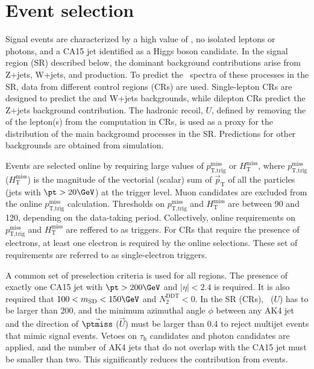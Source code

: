 \section{Event selection}


Signal events are characterized by a high value of \MET, no isolated leptons or photons, and a CA15 jet identified as a Higgs boson candidate. In the signal region (SR) described
below, the dominant background contributions arise from Z+jets,
W+jets, and \ttbar production. To predict the \ptmiss~spectra of these
processes in the SR, data from different control regions (CRs) are used. Single-lepton CRs are designed to predict the \ttbar and W+jets backgrounds, while dilepton CRs predict the Z+jets background contribution. The hadronic recoil, $U$, defined by removing the \pt of the lepton(s) from the \MET computation in CRs, is used as a proxy for the \MET distribution of the main background processes in the SR. Predictions for other backgrounds are obtained from simulation.

Events are selected online by requiring large values of $p_\text{T,trig}^\text{miss}$ or $H_{\text{T}}^{\text{miss}}$, where $p_\text{T,trig}^\text{miss}$  ($H_{\text{T}}^{\text{miss}}$) is the magnitude of the vectorial (scalar) sum of $\vec{p}_\text{T}$ of all the particles (jets with $\pt>20\GeV$) at the trigger level. Muon candidates are excluded from the online $p_\text{T,trig}^\text{miss}$ calculation.
Thresholds on $p_\text{T,trig}^\text{miss}$ and $H_{\text{T}}^{\text{miss}}$ are between 90 and 120\GeV, depending on the data-taking period. Collectively, online requirements on $p_\text{T,trig}^\text{miss}$ and $H_{\text{T}}^{\text{miss}}$ are reffered to as \MET triggers.
For CRs that require the presence of electrons, at least one electron is required by the online selections. These set of requirements are referred to as single-electron triggers.

A common set of preselection criteria is used for all regions. The presence of exactly one CA15 jet with $\pt>200\GeV$ and $|\eta|<2.4$ is required. It is also required that $100<m_{\text{SD}}<150\GeV$ and $N_2^{\text{DDT}}<0$. 
 In the SR (CRs), \ptmiss~($U$) has to be larger than 200\GeV, and the minimum azimuthal angle $\phi$ between any AK4 jet and the direction of $\vec{\ptmiss}$ ($\vec{U}$) must be larger than 0.4 to reject multijet events that mimic signal events. Vetoes on $\tau_\text{h}$ candidates and photon candidates are applied, and the number of AK4 jets that do not overlap with the CA15 jet must be smaller than two. This significantly reduces the contribution from \ttbar events.

